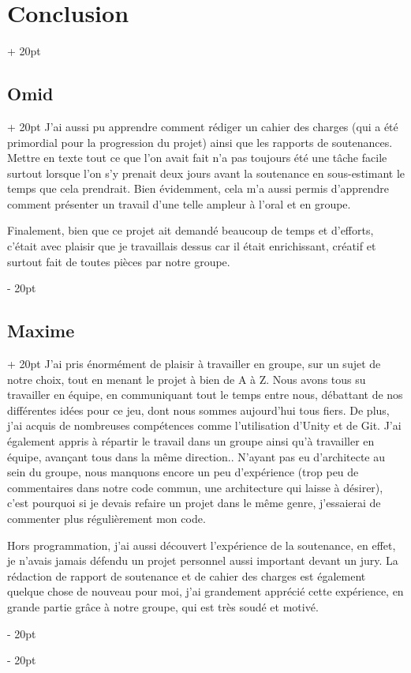 \documentclass[a4paper, 12pt, twoside]{article}
\newcommand{\ind}[1][20pt]{\advance\leftskip + #1}
\newcommand{\deind}[1][20pt]{\advance\leftskip - #1}
\newenvironment{indt}[2][20pt]{#2 \par \ind[#1]}{\par \deind} %
\begin{document}
\begin{indt}{\section{Conclusion}}
\begin{indt}{\subsection{Omid}}
            J’ai aussi pu apprendre comment rédiger un cahier des charges (qui a été primordial pour la progression du projet) ainsi que les rapports de soutenances. Mettre en texte tout ce que l’on avait fait n’a pas toujours été une tâche facile surtout lorsque l’on s’y prenait deux jours avant la soutenance en sous-estimant le temps que cela prendrait. Bien évidemment, cela m’a aussi permis d’apprendre comment présenter un travail d’une telle ampleur à l’oral et en groupe.

            Finalement, bien que ce projet ait demandé beaucoup de temps et d’efforts, c’était avec plaisir que je travaillais dessus car il était enrichissant, créatif et surtout fait de toutes pièces par notre groupe.
        \end{indt}

        \begin{indt}{\subsection{Maxime}}
            J’ai pris énormément de plaisir à travailler en groupe, sur un sujet de notre choix, tout en menant le projet à bien de A à Z. Nous avons tous su travailler  en équipe, en communiquant tout le temps entre nous, débattant de nos différentes idées pour ce jeu, dont nous sommes aujourd’hui tous fiers. De plus, j’ai acquis de nombreuses compétences comme l’utilisation d’Unity et de Git. J’ai également appris à répartir le travail dans un groupe ainsi qu’à travailler en équipe, avançant tous dans la même direction.. N’ayant pas eu d’architecte au sein du groupe, nous manquons encore un peu d’expérience (trop peu de commentaires dans notre code commun, une architecture qui laisse à désirer), c’est pourquoi si je devais refaire un projet dans le même genre, j'essaierai de commenter plus régulièrement mon code.

            Hors programmation, j’ai aussi découvert l’expérience de la soutenance, en effet, je n’avais jamais défendu un projet personnel aussi important devant un jury. La rédaction de rapport de soutenance et de cahier des charges est également quelque chose de nouveau pour moi, j’ai grandement apprécié cette expérience, en grande partie grâce à notre groupe, qui est très soudé et motivé.
        \end{indt}
    \end{indt}

    \newpage
\end{document}
